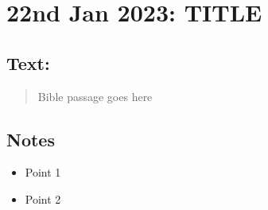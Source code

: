 \section{22nd Jan 2023: TITLE}
\subsection*{Text: }
  \begin{quote}
    Bible passage goes here
  \end{quote}
\subsection*{Notes}
\begin{itemize}
  \item{Point 1}
  \item{Point 2}
\end{itemize}